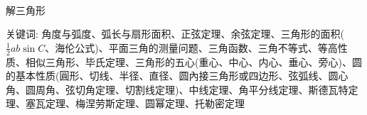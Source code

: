 \pagecolor{PageColor}
\
\vfil
\hfil  {\fontsize{50pt}{36pt}\selectfont{几何}} \hfil
\vfil

\thispagestyle{empty}
\pagebreak

\begin{center}
  {\fontsize{30pt}{26pt}\selectfont
    \hypertarget{解三角形}{解三角形} \label{解三角形}
  }
\end{center}
\separator
\begin{center}
    关键词: 角度与弧度、弧长与扇形面积、正弦定理、余弦定理、三角形的面积($\frac{1}{2}ab\sin C$、海伦公式)、平面三角的测量问题、三角函数、三角不等式、等高性质、相似三角形、毕氏定理、三角形的五心(重心、中心、内心、垂心、旁心)、圆的基本性质(圓形、切线、半径、直径、圆內接三角形或四边形、弦弧线、圆心角、圆周角、弦切角定理、切割线定理)、中线定理、角平分线定理、斯德瓦特定理、塞瓦定理、梅涅劳斯定理、圆幂定理、托勒密定理
\end{center}
\vspace{0.5pt}

